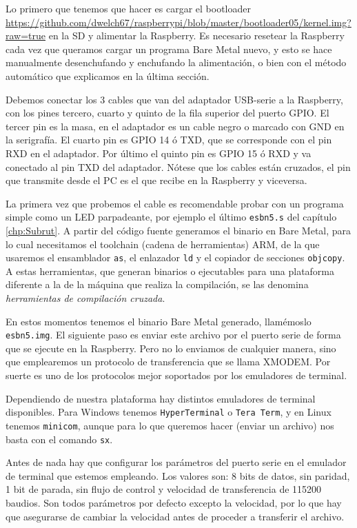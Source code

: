 Lo primero que tenemos que hacer es cargar el bootloader\newline
\textcolor{blue}{
  \href{https://github.com/dwelch67/raspberrypi/blob/master/bootloader05/kernel.img?raw=true}
  {https://github.com/dwelch67/raspberrypi/blob/master/bootloader05/kernel.img?raw=true}}
en la SD y alimentar la Raspberry. Es necesario resetear la Raspberry cada vez que
queramos cargar un programa Bare Metal nuevo, y esto se hace manualmente desenchufando y
enchufando la alimentación, o bien con el método automático que explicamos en la última sección.

Debemos conectar los 3 cables que van del adaptador USB-serie a la Raspberry, con los pines
tercero, cuarto y quinto de la fila superior del puerto GPIO. El tercer pin es la masa, en el
adaptador es un cable negro o marcado con GND en la serigrafía. El cuarto pin es GPIO 14 ó TXD,
que se corresponde con el pin RXD en el adaptador. Por último el quinto pin es GPIO 15 ó RXD y
va conectado al pin TXD del adaptador. Nótese que los cables están cruzados, el pin que
transmite desde el PC es el que recibe en la Raspberry y viceversa.

La primera vez que probemos el cable es recomendable probar con un programa simple como un
LED parpadeante, por ejemplo el último {\tt esbn5.s} del capítulo \ref{chp:Subrut}. A partir
del código fuente generamos el binario en Bare Metal, para lo cual necesitamos el toolchain
(cadena de herramientas) ARM, de la que usaremos el ensamblador {\tt as}, el enlazador {\tt ld}
y el copiador de secciones {\tt objcopy}. A estas herramientas, que generan binarios
o ejecutables para una plataforma diferente a la de la máquina que realiza la compilación,
se las denomina {\it herramientas de compilación cruzada}.

En estos momentos tenemos el binario Bare Metal generado, llamémoslo {\tt esbn5.img}. El
siguiente paso es enviar este archivo por el puerto serie de forma que se ejecute en la
Raspberry. Pero no lo enviamos de cualquier manera, sino que emplearemos un protocolo
de transferencia que se llama XMODEM. Por suerte es uno de los protocolos mejor soportados
por los emuladores de terminal.

Dependiendo de nuestra plataforma hay distintos emuladores de terminal disponibles. Para
Windows tenemos {\tt HyperTerminal} o {\tt Tera Term}, y en Linux tenemos {\tt minicom},
aunque para lo que queremos hacer (enviar un archivo) nos basta con el comando {\tt sx}.

Antes de nada hay que configurar los parámetros del puerto serie en el emulador de
terminal que estemos empleando. Los valores son: 8 bits de datos, sin paridad, 1 bit de
parada, sin flujo de control y velocidad de transferencia de 115200 baudios. Son todos
parámetros por defecto excepto la velocidad, por lo que hay que asegurarse de cambiar
la velocidad antes de proceder a transferir el archivo.

